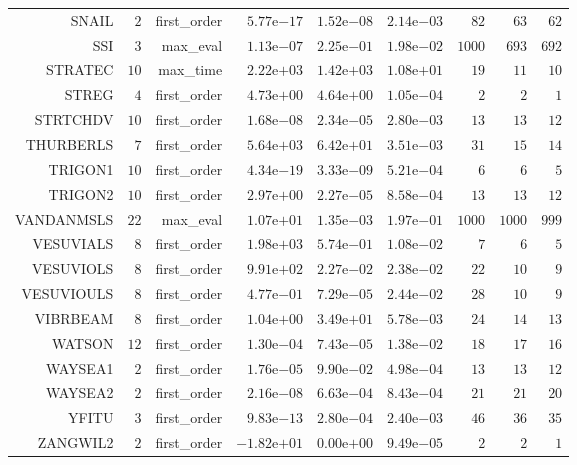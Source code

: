 \begin{longtable}{rrrrrrrrr}
SNAIL & \(     2\) & first\_order & \( 5.77\)e\(-17\) & \( 1.52\)e\(-08\) & \( 2.14\)e\(-03\) & \(    82\) & \(    63\) & \(    62\) \\
SSI & \(     3\) & max\_eval & \( 1.13\)e\(-07\) & \( 2.25\)e\(-01\) & \( 1.98\)e\(-02\) & \(  1000\) & \(   693\) & \(   692\) \\
STRATEC & \(    10\) & max\_time & \( 2.22\)e\(+03\) & \( 1.42\)e\(+03\) & \( 1.08\)e\(+01\) & \(    19\) & \(    11\) & \(    10\) \\
STREG & \(     4\) & first\_order & \( 4.73\)e\(+00\) & \( 4.64\)e\(+00\) & \( 1.05\)e\(-04\) & \(     2\) & \(     2\) & \(     1\) \\
STRTCHDV & \(    10\) & first\_order & \( 1.68\)e\(-08\) & \( 2.34\)e\(-05\) & \( 2.80\)e\(-03\) & \(    13\) & \(    13\) & \(    12\) \\
THURBERLS & \(     7\) & first\_order & \( 5.64\)e\(+03\) & \( 6.42\)e\(+01\) & \( 3.51\)e\(-03\) & \(    31\) & \(    15\) & \(    14\) \\
TRIGON1 & \(    10\) & first\_order & \( 4.34\)e\(-19\) & \( 3.33\)e\(-09\) & \( 5.21\)e\(-04\) & \(     6\) & \(     6\) & \(     5\) \\
TRIGON2 & \(    10\) & first\_order & \( 2.97\)e\(+00\) & \( 2.27\)e\(-05\) & \( 8.58\)e\(-04\) & \(    13\) & \(    13\) & \(    12\) \\
VANDANMSLS & \(    22\) & max\_eval & \( 1.07\)e\(+01\) & \( 1.35\)e\(-03\) & \( 1.97\)e\(-01\) & \(  1000\) & \(  1000\) & \(   999\) \\
VESUVIALS & \(     8\) & first\_order & \( 1.98\)e\(+03\) & \( 5.74\)e\(-01\) & \( 1.08\)e\(-02\) & \(     7\) & \(     6\) & \(     5\) \\
VESUVIOLS & \(     8\) & first\_order & \( 9.91\)e\(+02\) & \( 2.27\)e\(-02\) & \( 2.38\)e\(-02\) & \(    22\) & \(    10\) & \(     9\) \\
VESUVIOULS & \(     8\) & first\_order & \( 4.77\)e\(-01\) & \( 7.29\)e\(-05\) & \( 2.44\)e\(-02\) & \(    28\) & \(    10\) & \(     9\) \\
VIBRBEAM & \(     8\) & first\_order & \( 1.04\)e\(+00\) & \( 3.49\)e\(+01\) & \( 5.78\)e\(-03\) & \(    24\) & \(    14\) & \(    13\) \\
WATSON & \(    12\) & first\_order & \( 1.30\)e\(-04\) & \( 7.43\)e\(-05\) & \( 1.38\)e\(-02\) & \(    18\) & \(    17\) & \(    16\) \\
WAYSEA1 & \(     2\) & first\_order & \( 1.76\)e\(-05\) & \( 9.90\)e\(-02\) & \( 4.98\)e\(-04\) & \(    13\) & \(    13\) & \(    12\) \\
WAYSEA2 & \(     2\) & first\_order & \( 2.16\)e\(-08\) & \( 6.63\)e\(-04\) & \( 8.43\)e\(-04\) & \(    21\) & \(    21\) & \(    20\) \\
YFITU & \(     3\) & first\_order & \( 9.83\)e\(-13\) & \( 2.80\)e\(-04\) & \( 2.40\)e\(-03\) & \(    46\) & \(    36\) & \(    35\) \\
ZANGWIL2 & \(     2\) & first\_order & \(-1.82\)e\(+01\) & \( 0.00\)e\(+00\) & \( 9.49\)e\(-05\) & \(     2\) & \(     2\) & \(     1\) \\\hline
\end{longtable}
